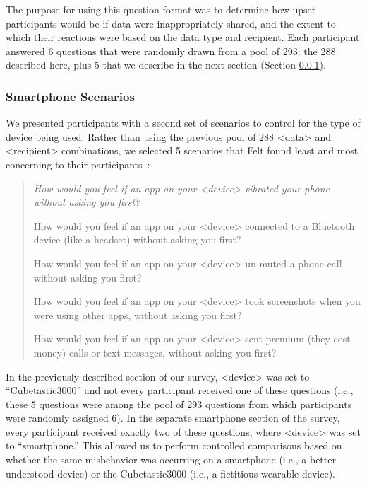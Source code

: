 The purpose for using this question format was to determine how upset participants would be if data were inappropriately shared, and the extent to which their reactions were based on the data type and recipient. Each participant answered 6 questions that were randomly drawn from a pool of 293: the 288 described here, plus 5 that we describe in the next section (Section \ref{sec:smartphones}).

\subsubsection{Smartphone Scenarios}
\label{sec:smartphones}
We presented participants with a second set of scenarios to control for the type of device being used. Rather than using the previous pool of 288 <data> and <recipient> combinations, we selected 5 scenarios that Felt \etal found least and most concerning to their participants~\cite{Felt}:

\begin{quotation}
\begin{enumerate}[topsep=0pt,itemsep=-1ex,partopsep=1ex,parsep=1ex]
\item {\it How would you feel if an app on your <device> vibrated your phone without asking you first?
\item How would you feel if an app on your <device> connected to a Bluetooth device (like a headset) without asking you first?
\item How would you feel if an app on your <device> un-muted a phone call without asking you first?
\item How would you feel if an app on your <device> took screenshots when you were using other apps, without asking you first?
\item How would you feel if an app on your <device> sent premium (they cost money) calls or text messages, without asking you first?}
\end{enumerate}
\end{quotation}

In the previously described section of our survey, <device> was set to ``Cubetastic3000'' and not every participant received one of these questions (i.e., these 5 questions were among the pool of 293 questions from which participants were randomly assigned 6). In the separate smartphone section of the survey, every participant received exactly two of these questions, where <device> was set to ``smartphone.'' This allowed us to perform controlled comparisons based on whether the same misbehavior was occurring on a smartphone (i.e., a better understood device) or the Cubetastic3000 (i.e., a fictitious wearable device).

